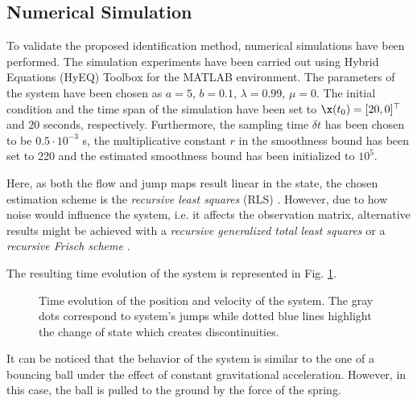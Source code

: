 \subsection{Numerical Simulation}
To validate the proposed identification method, numerical simulations have been performed. The simulation experiments have been carried out using Hybrid Equations (HyEQ) Toolbox \cite{sanfelice2013toolbox} for the MATLAB environment. The parameters of the system have been chosen as $a = 5$, $b = 0.1$, $\lambda=0.99$, $\mu=0$. 
%
The initial condition and the time span of the simulation have been set to $\x(t_0)=[20,0]^\top$ and $20$ seconds, respectively. Furthermore, the sampling time $\delta t$ has been chosen to be $0.5\cdot 10^{-3}$ s, the multiplicative constant $r$ in the smoothness bound has been set to 220 and the estimated smoothness bound has been initialized to $10^5$.
{%

Here, as both the flow and jump maps result linear in the state, the chosen estimation scheme is the \textit{recursive least squares} (RLS) \cite{ljung1987system}. However, due to how noise would influence the system, i.e. it affects the observation matrix, alternative results might be achieved with a \textit{recursive generalized total least squares} \cite{RHODE20144637} or a \textit{recursive Frisch scheme} \cite{massaroli2018prf}.
}
The resulting time evolution of the system is represented in Fig. \ref{fig:trj}. 
\begin{figure}
	\centering
    
	\caption{Time evolution of the position and velocity of the system. The gray dots correspond to system's jumps while dotted blue lines highlight the change of state which creates discontinuities.}
	\label{fig:trj}
\end{figure}
%
%
%
It can be noticed that the behavior of the system is similar to the one of a bouncing ball under the effect of constant gravitational acceleration. However, in this case, the ball is pulled to the ground by the force of the spring.

